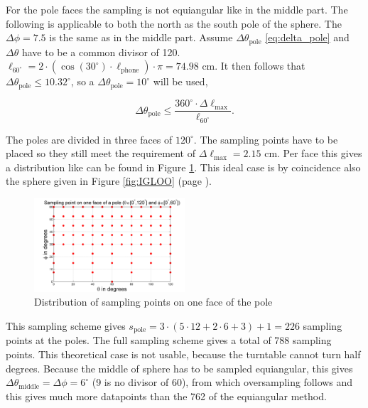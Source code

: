 For the pole faces the sampling is not equiangular like in the middle part.
The following is applicable to both the north as the south pole of the sphere.
The $\Delta\phi=7.5$ is the same as in the middle part.
Assume $\Delta\theta_\text{pole}$ \eqref{eq:delta_pole} and $\Delta\theta$ have to be a common divisor of 120.
$\ell_{60^\circ}=2\cdot(\cos(30^\circ)\cdot\ell_\text{phone})\cdot\pi=74.98$ cm.
It then follows that $\Delta\theta_\text{pole}\leq10.32^\circ$, so a $\Delta\theta_\text{pole}=10^\circ$ will be used,

\begin{equation}
\label{eq:delta_pole}\Delta\theta_\text{pole}\leq\dfrac{360^\circ\cdot\Delta\ell_\text{max}}{\ell_{60^\circ}}.
\end{equation}

The poles are divided in three faces of $120^\circ$. The sampling points have to be placed so they still meet the requirement of $\Delta\ell_\text{max}=2.15$ cm.
Per face this gives a distribution like can be found in Figure \ref{fig:poolvlak}.
This ideal case is by coincidence also the sphere given in Figure \ref{fig:IGLOO} (page \pageref{fig:IGLOO}).

\begin{figure}
    \centering
    \includegraphics[width=0.5\textwidth]{afbeeldingen/poolvlak_optimaal.png}
    \caption{Distribution of sampling points on one face of the pole}
    \label{fig:poolvlak}
\end{figure}
This sampling scheme gives $s_\text{pole}=3\cdot(5\cdot12+2\cdot6+3)+1=226$ sampling points at the poles.
The full sampling scheme gives a total of 788 sampling points.
This theoretical case is not usable, because the turntable cannot turn half degrees. Because the middle of sphere has to be sampled equiangular, this gives $\Delta\theta_\text{middle}=\Delta\phi=6^\circ$ (9 is no divisor of 60), from which oversampling follows and this gives much more datapoints than the 762 of the equiangular method.

